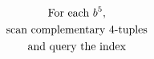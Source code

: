 \documentclass[preview]{standalone}
\begin{document}
\begin{gather*}
\special{dvisvgm:raw <g id='unique000'>}\text{For each } b^5, \\ \text{scan complementary 4-tuples}  \\ \text{and query the index}\special{dvisvgm:raw </g>}
\end{gather*}
\end{document}
